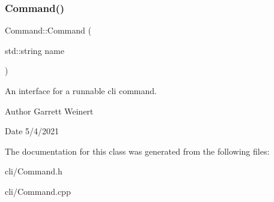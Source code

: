 \subsubsection{\texorpdfstring{Command()}{Command()}}
{\footnotesize\ttfamily Command\+::\+Command (\begin{DoxyParamCaption}\item[{std\+::string}]{name }\end{DoxyParamCaption})}

An interface for a runnable cli command. \begin{DoxyAuthor}{Author}
Garrett Weinert 
\end{DoxyAuthor}
\begin{DoxyDate}{Date}
5/4/2021 
\end{DoxyDate}


The documentation for this class was generated from the following files\+:\begin{DoxyCompactItemize}
\item 
cli/Command.\+h\item 
cli/Command.\+cpp\end{DoxyCompactItemize}
